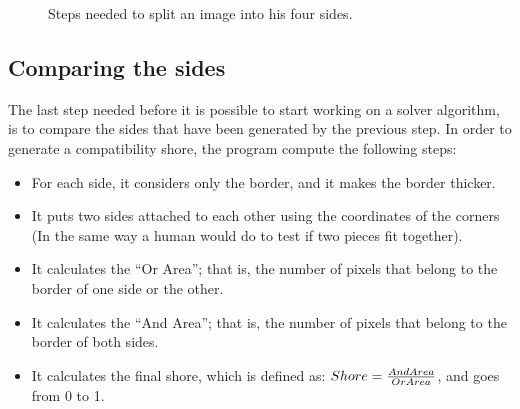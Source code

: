 \documentclass{article}
\begin{document}
\begin{figure}
  \caption{Steps needed to split an image into his four sides.}
  \label{fig:splitting_sides}
  
\end{figure}

\subsection{Comparing the sides}\label{document:my_comparator}
The last step needed before it is possible to start working on
a solver algorithm, is to compare the sides that have been
generated by the previous step.\newline
In order to generate a compatibility shore,
the program compute the following steps:

\begin{itemize}
  \item For each side, it considers only the border, and it makes the border thicker.
  \item It puts two sides attached to each other using the coordinates of the corners (In the same way a human would do to test if two pieces fit together).
  \item It calculates the “Or Area”; that is, the number of pixels that belong to the border of one side or the other.
  \item It calculates the “And Area”; that is, the number of pixels that belong to the border of both sides.
  \item It calculates the final shore, which is defined as: \(Shore = \frac{And \space Area}{Or \space Area}\), and goes from 0 to 1.
\end{itemize}
\end{document}
